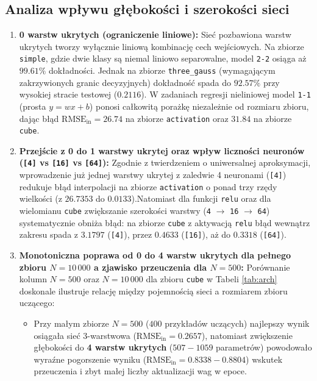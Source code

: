\documentclass{article}
\begin{document}
\subsection{Analiza wpływu głębokości i szerokości sieci}
\begin{enumerate}
    \item \textbf{0 warstw ukrytych (ograniczenie liniowe):}
    Sieć pozbawiona warstw ukrytych tworzy wyłącznie liniową kombinację cech wejściowych. Na zbiorze \texttt{simple}, gdzie dwie klasy są niemal liniowo separowalne, model \texttt{2-2} osiąga aż $99.61\%$ dokładności. Jednak na zbiorze \texttt{three\_gauss} (wymagającym zakrzywionych granic decyzyjnych) dokładność spada do $92.57\%$ przy wysokiej stracie testowej ($0.2116$). W zadaniach regresji nieliniowej model \texttt{1-1} (prosta $y = wx + b$) ponosi całkowitą porażkę niezależnie od rozmiaru zbioru, dając błąd $\text{RMSE}_{\text{in}} = 26.74$ na zbiorze \texttt{activation} oraz $31.84$ na zbiorze \texttt{cube}.
    \item \textbf{Przejście z 0 do 1 warstwy ukrytej oraz wpływ liczności neuronów (\texttt{[4]} vs \texttt{[16]} vs \texttt{[64]}):}
    Zgodnie z twierdzeniem o uniwersalnej aproksymacji, wprowadzenie już jednej warstwy ukrytej z zaledwie 4 neuronami (\texttt{[4]}) redukuje błąd interpolacji na zbiorze \texttt{activation} o ponad trzy rzędy wielkości (z $26.7353$ do $\mathbf{0.0133}$).Natomiast dla funkcji \texttt{relu} oraz dla wielomianu \texttt{cube} zwiększanie szerokości warstwy (\texttt{4} $\to$ \texttt{16} $\to$ \texttt{64}) systematycznie obniża błąd: na zbiorze \texttt{cube} z aktywacją \texttt{relu} błąd wewnątrz zakresu spada z $3.1797$ (\texttt{[4]}), przez $0.4633$ (\texttt{[16]}), aż do $0.3318$ (\texttt{[64]}).
    \item \textbf{Monotoniczna poprawa od 0 do 4 warstw ukrytych dla pełnego zbioru $N = 10\,000$ a zjawisko przeuczenia dla $N = 500$:}
    Porównanie kolumn $N = 500$ oraz $N = 10\,000$ dla zbioru \texttt{cube} w Tabeli \ref{tab:arch} doskonale ilustruje relację między pojemnością sieci a rozmiarem zbioru uczącego:
    \begin{itemize}
        \item Przy małym zbiorze \textbf{$N = 500$} ($400$ przykładów uczących) najlepszy wynik osiągała sieć 3-warstwowa ($\text{RMSE}_{\text{in}} = 0.2657$), natomiast zwiększenie głębokości do \textbf{4 warstw ukrytych} ($507 - 1059$ parametrów) powodowało wyraźne pogorszenie wyniku ($\text{RMSE}_{\text{in}} = 0.8338 - 0.8804$) wskutek przeuczenia i zbyt małej liczby aktualizacji wag w epoce.

\end{itemize}
\end{enumerate}
\end{document}
